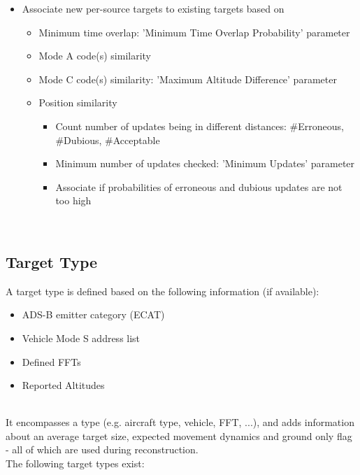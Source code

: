 \begin{itemize}
\item Associate new per-source targets to existing targets based on
\begin{itemize}
\item Minimum time overlap: 'Minimum Time Overlap Probability' parameter
\item Mode A code(s) similarity
\item Mode C code(s) similarity: 'Maximum Altitude Difference' parameter
\item Position similarity
\begin{itemize}
\item Count number of updates being in different distances: \#Erroneous, \#Dubious, \#Acceptable
\item Minimum number of updates checked: 'Minimum Updates' parameter
\item Associate if probabilities of erroneous and dubious updates are not too high
\end{itemize}
\end{itemize}
\end{itemize}
\ \\

\subsection{Target Type}

A target type is defined based on the following information (if available):

\begin{itemize}
\item ADS-B emitter category (ECAT)
\item Vehicle Mode S address list
\item Defined FFTs
\item Reported Altitudes
\end{itemize}

\ \\

It encompasses a type (e.g. aircraft type, vehicle, FFT, ...), and adds information about an average target size, expected movement dynamics and ground only flag - all of which are used during reconstruction. \\

The following target types exist:

